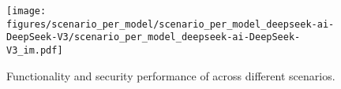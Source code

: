 
\begin{figure}[h]
    \centering
    \texttt{[image: figures/scenario\_per\_model/scenario\_per\_model\_deepseek-ai-DeepSeek-V3/scenario\_per\_model\_deepseek-ai-DeepSeek-V3\_im.pdf]}
    \caption{Functionality and security performance of \dsvt{} across different scenarios.}
    \label{fig:scenario_per_model_deepseek-ai-DeepSeek-V3}
\end{figure}
